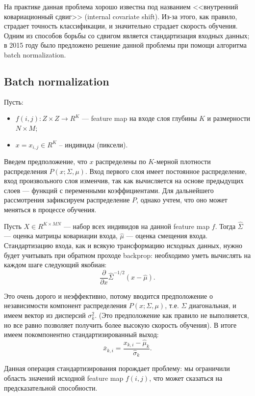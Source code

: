 \documentclass[12pt, specialist, subf, substylefile = spbu.rtx]{disser}
\begin{document}
На практике данная проблема хорошо известна под названием <<внутренний ковариационный сдвиг>> (internal covariate shift). Из-за этого, как правило, страдает точность классификации, и значительно страдает скорость обучения. Одним из способов борьбы со сдвигом является стандартизация входных данных; в 2015 году было предложено решение данной проблемы при помощи алгоритма batch normalization.

\subsection{Batch normalization}

Пусть:
\begin{itemize}
\item $f(i,j) : Z \times Z \to R^K$ --- feature map на входе слоя глубины $K$ и размерности $N \times M$;
\item $x=x_{i,j} \in R^{K}$ -- индивиды (пиксели).
\end{itemize}

Введем предположение, что $x$ распределены по $K$-мерной плотности распределения $P(x; \Sigma, \mu)$. Вход первого слоя имеет постоянное распределение, вход произвольного слоя изменчив, так как вычисляется на основе предыдущих слоев --- функций с переменными коэффициентами. Для дальнейшего рассмотрения зафиксируем распределение $P$, однако учтем, что оно может меняться в процессе обучения. 

Пусть $X \in R^{K \times MN}$ --- набор всех индивидов на данной feature map $f$. Тогда $\hat{\Sigma}$ --- оценка матрицы ковариации входа, $\hat{\mu}$ --- оценка смещения входа. Стандартизацию входа, как и всякую трансформацию исходных данных, нужно будет учитывать при обратном проходе backprop: необходимо уметь вычислять на каждом шаге следующий якобиан:
$$
\frac{\partial}{\partial x} \hat{\Sigma}^{-1/2}(x-\hat{\mu}).
$$

Это очень дорого и неэффективно, потому вводится предположение о независимости компонент распределения $P(x; \Sigma, \mu)$, т.е. $\Sigma$ диагональная, и имеем вектор из дисперсий $\sigma_k^2$. (Это предположение как правило не выполняется, но все равно позволяет получить более высокую скорость обучения). В итоге имеем покомпонентно стандартизированный выход:
$$
\bar{x}_{k, i} = \frac{x_{k, i} - \hat{\mu}_k}{\hat{\sigma}_k}.
$$

Данная операция стандартизирования порождает проблему: мы ограничили область значений исходной feature map $f(i, j)$, что может сказаться на предсказательной способности.
\end{document}
